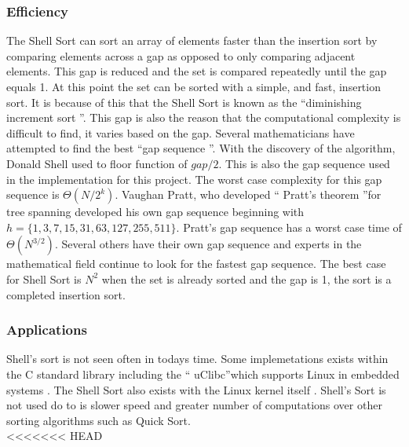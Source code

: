 \documentclass{article}
\begin{document}
    \subsubsection{Efficiency}
        The Shell Sort can sort an array of elements faster than the insertion
        sort by comparing elements across a gap as opposed to only comparing
        adjacent elements. This gap is reduced and the set is compared
        repeatedly until the gap equals 1. At this point the set can be sorted
        with a simple, and fast, insertion sort. It is because of this that the
        Shell Sort is known as the \textquotedblleft diminishing increment sort
        \textquotedblright \cite{education}. This gap is also the reason that
        the computational complexity is difficult to find, it varies based on
        the gap. Several mathematicians have attempted to find the best
        \textquotedblleft gap sequence \textquotedblright. With the discovery
        of the algorithm, Donald Shell used to floor function of $gap / 2$.
        This is also the gap sequence used in the implementation for this
        project. The worst case complexity for this gap sequence is
        $\Theta (N/2^k)$. Vaughan Pratt, who developed \textquotedblleft
        Pratt's theorem \textquotedblright for tree spanning developed his own
        gap sequence beginning with $h= \{ 1, 3, 7, 15, 31, 63, 127, 255, 511
        \}$. Pratt's gap sequence has a worst case time of $\Theta (N^{3/2})$.
        Several others have their own gap sequence and experts in the
        mathematical field continue to look for the fastest gap
        sequence\cite{princton}. The best case for Shell Sort is $N^2$ when the
        set is already sorted and the gap is 1, the sort is a completed 
        insertion sort.\\
    \subsubsection{Applications}
        Shell's sort is not seen often in todays time. Some implemetations 
        exists within the C standard library including the \textquotedblleft 
        uClibc\textquotedblright which supports Linux in embedded systems
        \cite{uClibc}. The Shell Sort also exists with the Linux kernel itself
        \cite{kernel}. Shell's Sort is not used do to is slower speed and 
        greater number of computations over other sorting algorithms such as 
        Quick Sort.\\
<<<<<<< HEAD
        
\end{document}
